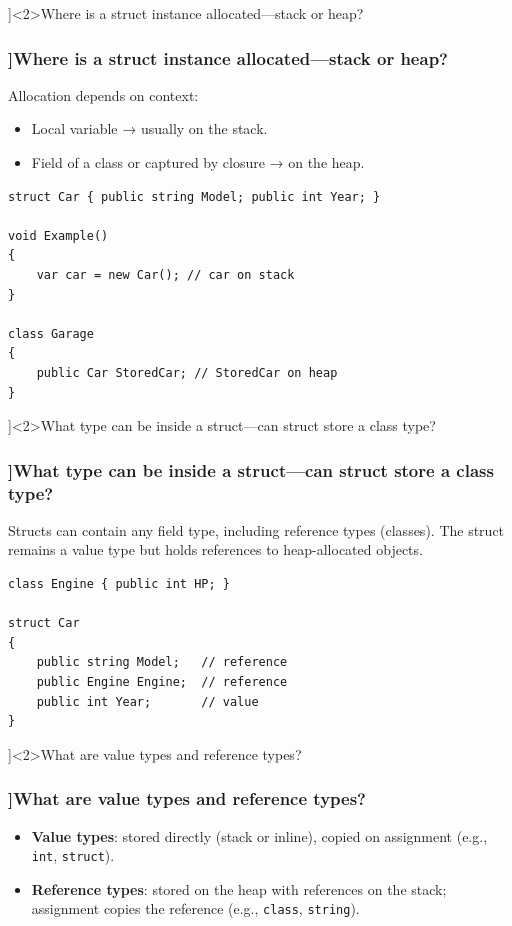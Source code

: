 \QuestionSlide[\CategoryBadge[MemoryColor!20]{Types \& Memory}]<2>{Where is a struct instance allocated—stack or heap?}
\begin{frame}[fragile]
  \frametitle{\AnswerTitle[\CategoryBadge[MemoryColor!20]{Types \& Memory}]{Where is a struct instance allocated—stack or heap?}}

  {\footnotesize
    Allocation depends on context:
    \begin{itemize}
      \item Local variable → usually on the stack.
      \item Field of a class or captured by closure → on the heap.
    \end{itemize}
  }

  \begin{verbatim}
struct Car { public string Model; public int Year; }

void Example()
{
    var car = new Car(); // car on stack
}

class Garage
{
    public Car StoredCar; // StoredCar on heap
}
  \end{verbatim}
\end{frame}

\QuestionSlide[\CategoryBadge[MemoryColor!20]{Types \& Memory}]<2>{What type can be inside a struct—can struct store a class type?}
\begin{frame}[fragile]
  \frametitle{\AnswerTitle[\CategoryBadge[MemoryColor!20]{Types \& Memory}]{What type can be inside a struct—can struct store a class type?}}

  {\footnotesize
    Structs can contain any field type, including reference types (classes). The struct remains a value type but holds references to heap-allocated objects.
  }

  \begin{verbatim}
class Engine { public int HP; }

struct Car
{
    public string Model;   // reference
    public Engine Engine;  // reference
    public int Year;       // value
}
  \end{verbatim}
\end{frame}

\QuestionSlide[\CategoryBadge[MemoryColor!20]{Types \& Memory}]<2>{What are value types and reference types?}
\begin{frame}[fragile]
  \frametitle{\AnswerTitle[\CategoryBadge[MemoryColor!20]{Types \& Memory}]{What are value types and reference types?}}

  {\footnotesize
    \begin{itemize}
      \item \textbf{Value types}: stored directly (stack or inline), copied on assignment (e.g., \texttt{int}, \texttt{struct}).
      \item \textbf{Reference types}: stored on the heap with references on the stack; assignment copies the reference (e.g., \texttt{class}, \texttt{string}).
    \end{itemize}
  }
\end{frame}

